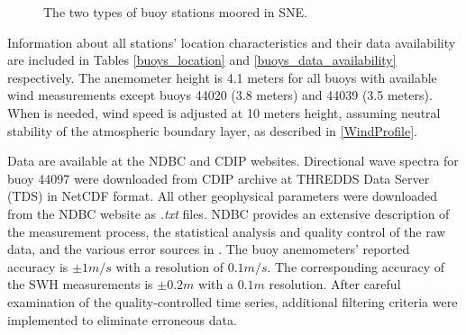 \begin{figure}
    \centering
    \qquad
    \caption{The two types of buoy stations moored in SNE.}
    \label{fig:example}%
\end{figure}


Information about all stations’ location characteristics and their data availability are included in Tables \ref{buoys_location} and \ref{buoys_data_availability} respectively. The anemometer height is 4.1 meters for all buoys with available wind measurements except buoys 44020 (3.8 meters) and 44039 (3.5 meters). When is needed, wind speed is adjusted at 10 meters height, assuming neutral stability of the atmospheric boundary layer, as described in \ref{WindProfile}. 


Data are available at the NDBC and CDIP websites. Directional wave spectra for buoy 44097 were downloaded from CDIP archive at THREDDS Data Server (TDS) in NetCDF format. All other geophysical parameters were downloaded from the NDBC website as \emph{.txt} files. NDBC provides an extensive description of the measurement process, the statistical analysis and quality control of the raw data, and the various error sources in \cite{Data2009}. The buoy anemometers' reported accuracy is $\pm 1m/s$ with a resolution of $0.1 m/s$. The corresponding accuracy of the SWH measurements is $\pm 0.2 m$ with a $0.1 m$ resolution. After careful examination of the quality-controlled time series, additional filtering criteria were implemented to eliminate erroneous data.


